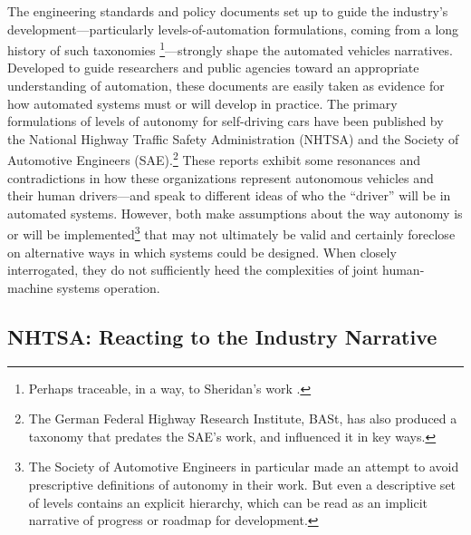 The engineering standards and
policy documents set up to
guide the industry's development---particularly levels-of-automation
formulations, coming from a long history of such taxonomies
\cite{PSWickens} \cite{SMART} \cite{ALFUS}
\cite{parasuramanW}\footnote{Perhaps traceable, in a way, to   
  Sheridan's work \cite[p. 23]{DSB}.}---strongly shape the automated
vehicles narratives. Developed to guide
researchers and public agencies toward an appropriate understanding of
automation, these documents are easily taken
as evidence for how automated systems must or will develop in
practice. The primary formulations of
levels of autonomy for self-driving cars 
have been published by the National Highway Traffic Safety
Administration (NHTSA) and the Society of Automotive Engineers
(SAE).\footnote{The German Federal Highway Research Institute, BASt,
 has also produced a taxonomy that predates the SAE's work, and
 influenced it in key ways.}
These reports exhibit some resonances and contradictions in how these
organizations represent autonomous vehicles and their human
drivers---and speak to different ideas of who the ``driver'' will be
in automated systems. However, both make assumptions about
the way autonomy is or will be implemented\footnote{The Society of Automotive Engineers in particular
  made an attempt to avoid prescriptive definitions of autonomy in
  their work. But even a descriptive set of levels contains an
  explicit hierarchy, which can be read as an implicit narrative of
  progress or roadmap for development.} that may not ultimately be
valid and certainly foreclose on alternative ways in
which systems could be designed. When closely
interrogated, they do not sufficiently heed the
complexities of joint human-machine systems operation.



\subsection{NHTSA: Reacting to the Industry Narrative}

